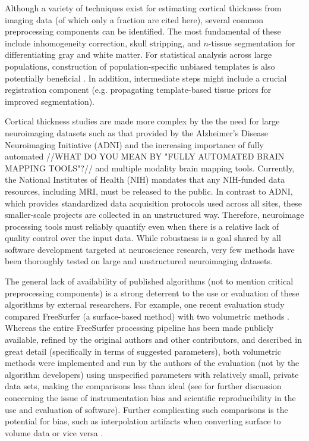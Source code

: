 Although a variety of techniques exist for estimating cortical thickness
from imaging data (of which only a fraction are cited here), several common preprocessing components
can be identified.  The most fundamental of these include inhomogeneity correction, skull stripping, and $n$-tissue segmentation for differentiating gray and white matter.  For statistical analysis
across large populations, construction of population-specific unbiased templates
is also potentially beneficial \citep{evans2012}.
In addition, intermediate steps might include a crucial registration component (e.g. 
propagating template-based tissue priors for improved segmentation).

Cortical thickness studies are made more complex by the
the need for large neuroimaging datasets such as that provided by the Alzheimer's
Disease Neuroimaging Initiative (ADNI) \citep{Weiner2012}
and the increasing importance of fully automated 
//WHAT DO YOU MEAN BY "FULLY AUTOMATED BRAIN MAPPING TOOLS"?//
and multiple modality brain mapping tools.  
Currently, the National Institutes of Health (NIH) mandates that any NIH-funded data
resources, including MRI, must be released to the public.  In contrast
to ADNI, which provides standardized data acquisition protocols used
across all sites, these smaller-scale projects are collected in an
unstructured way.  Therefore, neuroimage processing tools must
reliably quantify even when there is a relative lack of quality
control over the input data.  While robustness is a goal shared by all
software development targeted at neuroscience research, very few methods have
been thoroughly tested on large and unstructured neuroimaging datasets.


The general lack of availability of published
algorithms \citep{kovacevic2006} (not to mention critical preprocessing
components) is a strong deterrent to the use or evaluation of these algorithms
by external researchers.  For example, one recent evaluation
study \citep{clarkson2011} compared
FreeSurfer (a surface-based method) with two volumetric methods \citep{jones2000,das2009}.
Whereas the entire FreeSurfer processing pipeline has been made publicly available, 
refined by the original authors and other contributors, and described in great detail 
(specifically in terms of suggested parameters), both volumetric methods were
implemented and run by the authors of the evaluation (not by the algorithm developers)
using unspecified parameters with relatively small, private data sets,
making the comparisons less than ideal (see \cite{tustison2013} for further discussion
concerning the issue of instrumentation bias and scientific reproducibility in the use and evaluation of software).
Further complicating such comparisons is the potential for bias, such as interpolation artifacts when
converting surface to volume data or vice versa \citep{klein2010}.

